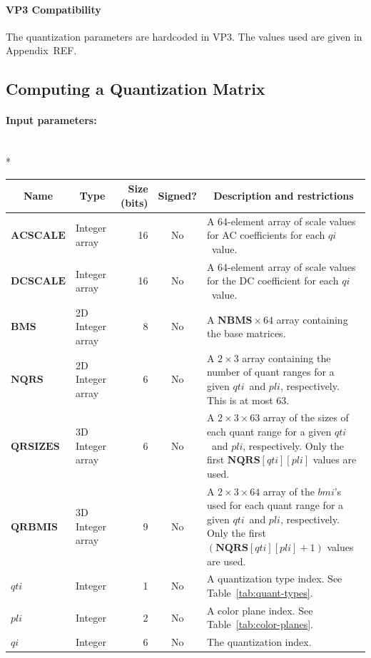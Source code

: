 \documentclass[11pt,letterpaper]{book}
\newcommand{\idx}[1]{{\ensuremath{\mathit{#1}}}}
\newcommand{\qti}{\idx{qti}}
\newcommand{\pli}{\idx{pli}}
\newcommand{\qi}{\idx{qi}}
\newcommand{\bmi}{\idx{bmi}}
\newcommand{\bitvar}[1]{\ensuremath{\mathbf{\bm #1}}}
\numberwithin{equation}{chapter}
\numberwithin{figure}{chapter}
\numberwithin{table}{chapter}
\begin{document}
\paragraph{VP3 Compatibility}

The quantization parameters are hardcoded in VP3.
The values used are given in Appendix~REF.

\subsection{Computing a Quantization Matrix}
\label{sub:quant-mat}

\paragraph{Input parameters:}\hfill\\*
\begin{tabularx}{\textwidth}{@{}llrcX@{}}\toprule
\multicolumn{1}{c}{Name} &
\multicolumn{1}{c}{Type} &
\multicolumn{1}{p{30pt}}{\centering Size (bits)} &
\multicolumn{1}{c}{Signed?} &
\multicolumn{1}{c}{Description and restrictions} \\\midrule\endhead
\bitvar{ACSCALE} & \multicolumn{1}{p{40pt}}{Integer array} &
                             16 & No & A 64-element array of scale values for
 AC coefficients for each \qi\ value. \\
\bitvar{DCSCALE} & \multicolumn{1}{p{40pt}}{Integer array} &
                             16 & No & A 64-element array of scale values for
 the DC coefficient for each \qi\ value. \\
\bitvar{BMS}     & \multicolumn{1}{p{50pt}}{2D Integer array} &
                              8 & No & A $\bitvar{NBMS}\times 64$ array
 containing the base matrices. \\
\bitvar{NQRS}    & \multicolumn{1}{p{50pt}}{2D Integer array} &
                              6 & No & A $2\times 3$ array containing the
 number of quant ranges for a given \qti\ and \pli, respectively.
This is at most $63$. \\
\bitvar{QRSIZES} & \multicolumn{1}{p{50pt}}{3D Integer array} &
                              6 & No & A $2\times 3\times 63$ array of the
 sizes of each quant range for a given \qti\ and \pli, respectively.
Only the first $\bitvar{NQRS}[\qti][\pli]$ values are used. \\
\bitvar{QRBMIS}  & \multicolumn{1}{p{50pt}}{3D Integer array} &
                              9 & No & A $2\times 3\times 64$ array of the
 \bmi's used for each quant range for a given \qti\ and \pli, respectively.
Only the first $(\bitvar{NQRS}[\qti][\pli]+1)$ values are used. \\
\bitvar{\qti}    & Integer &  1 & No & A quantization type index.
See Table~\ref{tab:quant-types}.\\
\bitvar{\pli}    & Integer &  2 & No & A color plane index.
See Table~\ref{tab:color-planes}.\\
\bitvar{\qi}     & Integer &  6 & No & The quantization index. \\
\bottomrule\end{tabularx}
\end{document}
